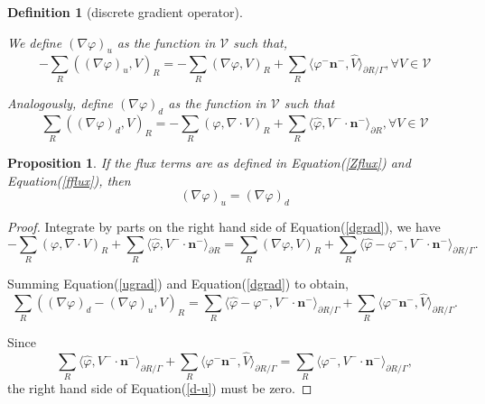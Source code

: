 \documentclass{article}
\newtheorem{prop}{Proposition}
\newtheorem{defi}{Definition}
\numberwithin{equation}{section}
\begin{document}
\begin{defi}[discrete gradient operator]\label{discretegrad}

    We define $\left(\nabla\varphi\right)_{u}$ as the function in $\mathcal{V}$ such that,
    \begin{equation}\label{ugrad}
        -\sum_{R}\left(\left(\nabla\varphi\right)_{u},V\right)_{R}=-\sum_{R}\left(\nabla\varphi,V\right)_{R}+\sum_{R}\langle\varphi^{-}\mathbf{n}^{-},\widehat{V}\rangle_{\partial R/\Gamma},\forall V\in\mathcal{V}
    \end{equation}

    Analogously, define $\left(\nabla\varphi\right)_{d}$ as the function
    in $\mathcal{V}$ such that
    \begin{equation}\label{dgrad}
        \sum_{R}\left(\left(\nabla\varphi\right)_{d},V\right)_{R}=-\sum_{R}\left(\varphi,\nabla\cdot V\right)_{R}+\sum_{R}\langle\widehat{\varphi},V^{-}\cdot\mathbf{n}^{-}\rangle_{\partial R},\forall V\in\mathcal{V}
    \end{equation}
\end{defi}


\begin{prop}\label{u_equiv_d}
    If the flux terms are as defined in Equation(\ref{Zflux}) and Equation(\ref{fflux}), then
    \begin{equation}
        \left(\nabla\varphi\right)_{u}=\left(\nabla\varphi\right)_{d}
    \end{equation}
\end{prop}

\begin{proof}
    Integrate by parts on the right hand side of Equation(\ref{dgrad}),  we have
    \begin{equation*}
        -\sum_{R}\left(\varphi,\nabla\cdot V\right)_{R}+\sum_{R}\langle\widehat{\varphi},V^{-}\cdot\mathbf{n}^{-}\rangle_{\partial R}=\sum_{R}\left(\nabla\varphi,V\right)_{R}+\sum_{R}\langle\widehat{\varphi}-\varphi^{-},V^{-}\cdot\mathbf{n}^{-}\rangle_{\partial R/\Gamma}.
    \end{equation*}

    Summing Equation(\ref{ugrad}) and Equation(\ref{dgrad}) to obtain, 
    \begin{equation}\label{d-u}
        \sum_{R}\left(\left(\nabla\varphi\right)_{d}-\left(\nabla\varphi\right)_{u},V\right)_{R}=\sum_{R}\langle\widehat{\varphi}-\varphi^{-},V^{-}\cdot\mathbf{n}^{-}\rangle_{\partial R/\Gamma}+\sum_{R}\langle\varphi^{-}\mathbf{n}^{-},\widehat{V}\rangle_{\partial R/\Gamma}.
    \end{equation}

    Since
    \begin{equation*}
        \sum_{R}\langle\widehat{\varphi},V^{-}\cdot\mathbf{n}^{-}\rangle_{\partial R/\Gamma}+\sum_{R}\langle\varphi^{-}\mathbf{n}^{-},\widehat{V}\rangle_{\partial R/\Gamma}=\sum_{R}\langle\varphi^{-},V^{-}\cdot\mathbf{n}^{-}\rangle_{\partial R/\Gamma},
    \end{equation*}
    the right hand side of  Equation(\ref{d-u}) must be zero.
    
\end{proof}
\end{document}
